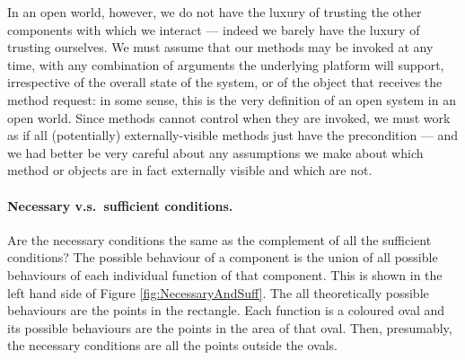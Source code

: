 In an open world, however, we do not have the luxury of trusting the
other components with which we interact --- indeed we barely have the
luxury of trusting ourselves.  We must assume that our methods may be
invoked at any time, with any combination of arguments the underlying
platform will support, irrespective of the overall state of the
system, or of the object that receives the method request: in some
sense, this is the very definition of an open system in an open world.
Since methods cannot control when they are invoked, we must work
as if all (potentially) externally-visible methods just have the precondition
 --- and we had better be very careful about any assumptions
we make about which method or objects are in fact externally visible
and which are not.  






\paragraph{Necessary v.s.\ sufficient conditions.}

Are the necessary conditions the same as the complement of all the
sufficient conditions?  The possible behaviour of a component is the
union of all possible behaviours of each individual function of that
component.  This is shown in the left hand side of
Figure \ref{fig:NecessaryAndSuff}. The all theoretically possible
behaviours are the points in the rectangle.  Each function is a
coloured oval and its possible behaviours are the points in the area
of that oval.  Then, presumably, the necessary conditions are all the
points outside the ovals.

